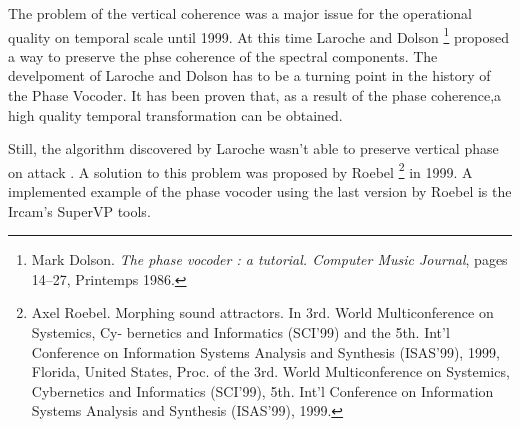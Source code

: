 The problem of the vertical coherence was a major issue for the operational quality on temporal scale until 1999. At this time Laroche and Dolson \footnote{Mark Dolson. \textit{The phase vocoder : a tutorial. Computer Music Journal}, pages 14–27, Printemps 1986.} proposed a way to preserve the phse coherence of the spectral components. The develpoment of Laroche and Dolson has to be a turning point in the history of the Phase Vocoder. It has been proven that, as a result of the phase coherence,a high quality temporal transformation can be obtained.


Still, the algorithm discovered by Laroche wasn't able to preserve vertical phase on attack . A solution to this problem was proposed by Roebel \footnote{Axel Roebel. Morphing sound attractors. In 3rd. World Multiconference on Systemics, Cy- bernetics and Informatics (SCI’99) and the 5th. Int’l Conference on Information Systems Analysis and Synthesis (ISAS’99), 1999, Florida, United States, Proc. of the 3rd. World Multiconference on Systemics, Cybernetics and Informatics (SCI’99), 5th. Int’l Conference on Information Systems Analysis and Synthesis (ISAS’99), 1999.} in 1999. A implemented example of the phase vocoder using the last version by Roebel is the Ircam's SuperVP tools.


